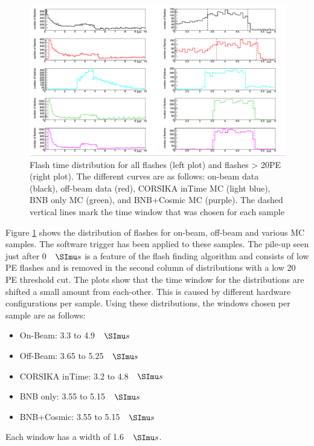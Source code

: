 \begin{figure}[htp!]
\includegraphics[width=\textwidth]{figs/flashdist.png}
\caption{Flash time distribution for all flashes (left plot) and flashes > 20PE (right plot). The different curves are as follows: on-beam data (black), off-beam data (red), CORSIKA inTime MC (light blue), BNB only MC (green), and BNB+Cosmic MC (purple). The dashed vertical lines mark the time window that was chosen for each sample}
\label{fig:beamwindow}
\end{figure}

Figure \ref{fig:beamwindow} shows the distribution of flashes for on-beam, off-beam and various MC samples. The software trigger has been applied to these samples. The pile-up seen just after 0 $\micro s$ is a feature of the flash finding algorithm and consists of low PE flashes and is removed in the second column of distributions with a low 20 PE threshold cut. The plots show that the time window for the distributions are shifted a small amount from each-other. This is caused by different hardware configurations per sample. Using these distributions, the windows chosen per sample are as follows:
\begin{itemize}
\item{On-Beam: 3.3 to 4.9 $\micro s$}
\item{Off-Beam: 3.65 to 5.25 $\micro s$} 
\item{CORSIKA inTime: 3.2 to 4.8 $\micro s$}
\item{BNB only: 3.55 to 5.15 $\micro s$} 
\item{BNB+Cosmic: 3.55 to 5.15 $\micro s$} 
\end{itemize}
Each window has a width of 1.6 $\micro s$. 


